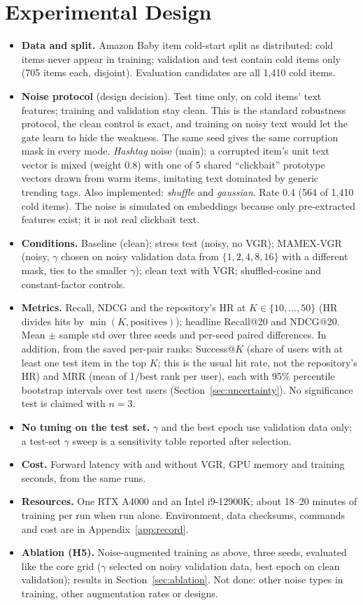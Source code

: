 \documentclass[conference]{IEEEtran}
\begin{document}
\section{Experimental Design}
\label{sec:design}

\begin{itemize}
\item \textbf{Data and split.} Amazon Baby item cold-start split as distributed: cold items never appear in training; validation and test contain cold items only (705 items each, disjoint). Evaluation candidates are all 1,410 cold items.
\item \textbf{Noise protocol} (design decision). Test time only, on cold items' text features; training and validation stay clean. This is the standard robustness protocol, the clean control is exact, and training on noisy text would let the gate learn to hide the weakness. The same seed gives the same corruption mask in every mode. \emph{Hashtag} noise (main): a corrupted item's unit text vector is mixed (weight 0.8) with one of 5 shared ``clickbait'' prototype vectors drawn from warm items, imitating text dominated by generic trending tags. Also implemented: \emph{shuffle} and \emph{gaussian}. Rate 0.4 (564 of 1,410 cold items). The noise is simulated on embeddings because only pre-extracted features exist; it is not real clickbait text.
\item \textbf{Conditions.} Baseline (clean); stress test (noisy, no VGR); MAMEX-VGR (noisy, $\gamma$ chosen on noisy validation data from $\{1,2,4,8,16\}$ with a different mask, ties to the smaller $\gamma$); clean text with VGR; shuffled-cosine and constant-factor controls.
\item \textbf{Metrics.} Recall, NDCG and the repository's HR at $K \in \{10,\dots,50\}$ (HR divides hits by $\min(K, \text{positives})$); headline Recall@20 and NDCG@20. Mean $\pm$ sample std over three seeds and per-seed paired differences. In addition, from the saved per-pair ranks: Success@$K$ (share of users with at least one test item in the top $K$; this is the usual hit rate, not the repository's HR) and MRR (mean of 1/best rank per user), each with 95\% percentile bootstrap intervals over test users (Section~\ref{sec:uncertainty}). No significance test is claimed with $n=3$.
\item \textbf{No tuning on the test set.} $\gamma$ and the best epoch use validation data only; a test-set $\gamma$ sweep is a sensitivity table reported after selection.
\item \textbf{Cost.} Forward latency with and without VGR, GPU memory and training seconds, from the same runs.
\item \textbf{Resources.} One RTX A4000 and an Intel i9-12900K; about 18--20 minutes of training per run when run alone. Environment, data checksums, commands and cost are in Appendix~\ref{app:record}.
\item \textbf{Ablation (H5).} Noise-augmented training as above, three seeds, evaluated like the core grid ($\gamma$ selected on noisy validation data, best epoch on clean validation); results in Section~\ref{sec:ablation}. Not done: other noise types in training, other augmentation rates or designs.
\end{itemize}
\end{document}
